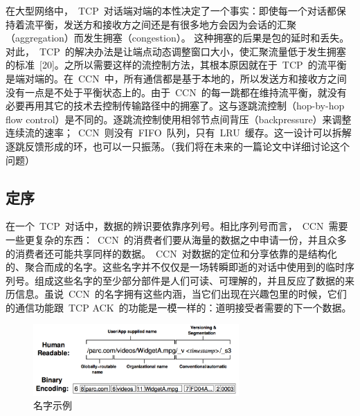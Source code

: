 在大型网络中，~TCP~对话端对端的本性决定了一个事实：即使每一个对话都保持着流平衡，发送方和接收方之间还是有很多地方会因为会话的汇聚（aggregation）而发生拥塞（congestion）。%
这种拥塞的后果是包的延时和丢失。对此，~TCP~的解决办法是让端点动态调整窗口大小，使汇聚流量低于发生拥塞的标准~[20]。之所以需要这样的流控制方法，其根本原因就在于~TCP~的流平衡是端对端的。在~CCN~中，所有通信都是基于本地的，所以发送方和接收方之间没有一点是不处于平衡状态上的。由于~CCN~的每一跳都在维持流平衡，就没有必要再用其它的技术去控制传输路径中的拥塞了。这与逐跳流控制（hop-by-hop flow control）是不同的。逐跳流控制使用相邻节点间背压（backpressure）来调整连续流的速率；~CCN~则没有~FIFO~队列，只有~LRU~缓存。这一设计可以拆解逐跳反馈形成的环，也可以一只振荡。（我们将在未来的一篇论文中详细讨论这个问题）

	
\subsection{定序}
\label{sec:3.2}
在一个~TCP~对话中，数据的辨识要依靠序列号。相比序列号而言，~CCN~需要一些更复杂的东西：~CCN~的消费者们要从海量的数据之中申请一份，并且众多的消费者还可能共享同样的数据。~CCN~对数据的定位和分享依靠的是结构化的、聚合而成的名字。这些名字并不仅仅是一场转瞬即逝的对话中使用到的临时序列号。组成这些名字的至少部分部件是人们可读、可理解的，并且反应了数据的来历信息。虽说~CCN~的名字拥有这些内涵，当它们出现在兴趣包里的时候，它们的通信功能跟~TCP ACK~的功能是一模一样的：道明接受者需要的下一个数据。

\begin{figure}
  \centering
  \includegraphics[width=0.7\textwidth]{images/name}
  \caption{名字示例} 
  \label{name}
\end{figure}

